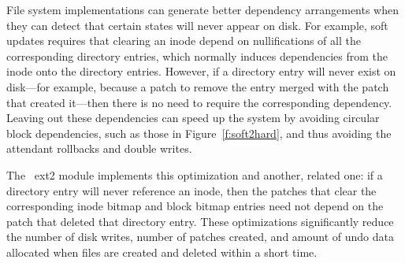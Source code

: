File system implementations can generate better dependency arrangements
when they can detect that certain states will never appear on disk.
%
For example, soft updates requires that clearing an inode
depend on nullifications of all the corresponding directory entries, which
normally induces dependencies from the inode onto the directory
entries.
%
However, if a directory entry will never exist on disk---for example,
because a patch to remove the entry merged with the patch that created
it---then there is no need to require the corresponding dependency.
%
Leaving out these dependencies can speed up the system by avoiding circular
block dependencies, such as those in Figure~\ref{f:soft2hard}, and thus
avoiding the attendant rollbacks and double writes.
%
\begin{comment}
A dependency from the inode clear onto the directory entry clear is
sufficient to ensure this property. However, when a directory entry
will never exist on disk because it is created and removed before the
creation is committed, the inode clear need not depend on the
directory entry clear.
\end{comment}
%
The \Kudos\ ext2 module implements this optimization and another, related
one: if a directory entry will never reference an inode, then the patches
that clear the corresponding inode bitmap and block bitmap entries need not
depend on the patch that deleted that directory entry.
%
These optimizations significantly reduce the number of disk writes, number
of patches created, and amount of undo data allocated when files are
created and deleted within a short time.



\begin{comment}
The buffer cache and a few other \modules\ perform better in the
common case that each block's \patches\ are listed in order of creation
time,
%
taking $O(n)$ time to process $n$ patches rather than $O(n^2)$.
\end{comment}

